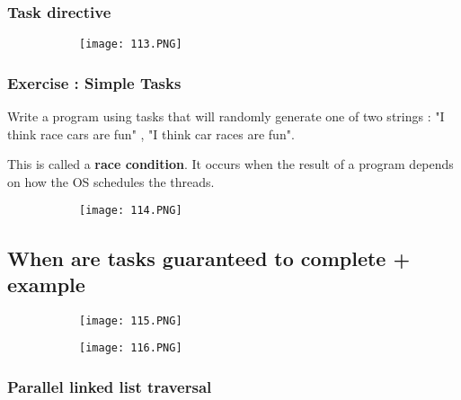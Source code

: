 \documentclass{article}
\begin{document}
\subsubsection{Task directive}

\begin{figure}[ht!]
  \centering
  \begin{subfigure}[b]{0.5\linewidth}
    \texttt{[image: 113.PNG]}
  \end{subfigure}
\end{figure}

\subsubsection{Exercise : Simple Tasks}

Write a program using tasks that will  randomly generate one of two strings : "I think race cars are fun" , "I think car races are fun".

This is called a \textbf{race condition}. It occurs when the result of a program depends on how the OS schedules the threads.

\begin{figure}[ht!]
  \centering
  \begin{subfigure}[b]{0.5\linewidth}
    \texttt{[image: 114.PNG]}
  \end{subfigure}
\end{figure}

\vspace{40mm}

\subsection{When are tasks guaranteed to complete + example}

\begin{figure}[ht!]
  \centering
  \begin{subfigure}[b]{0.5\linewidth}
    \texttt{[image: 115.PNG]}
  \end{subfigure}
     \begin{subfigure}[b]{0.49\textwidth}
         \centering
         \texttt{[image: 116.PNG]}
     \end{subfigure}
\end{figure}

\subsubsection{Parallel linked list traversal}
\end{document}
